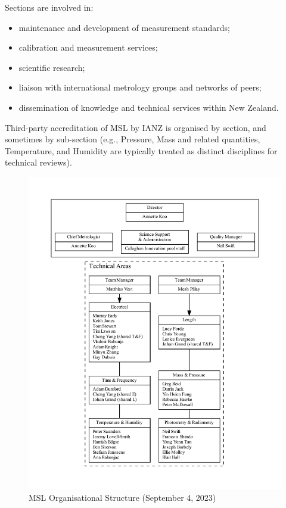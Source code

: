 Sections are involved in:
\begin{itemize}
\item	maintenance and development of measurement standards; 
\item	calibration and measurement services;
\item	scientific research;
\item	liaison with international metrology groups and networks of peers; 
\item	dissemination of knowledge and technical services within New Zealand.
\end{itemize}

Third-party accreditation of MSL by IANZ is organised by section, and sometimes by sub-section (e.g., Pressure, Mass and related quantities, Temperature, and Humidity are typically treated as distinct disciplines for technical reviews).

\begin{figure}
\begin{center}
\includegraphics[width=1.1\textwidth]{pictures/MSL_org_full}
\end{center}
\caption{MSL Organisational Structure (September 4, 2023)}
\label{fig:org_msl}
\end{figure}


